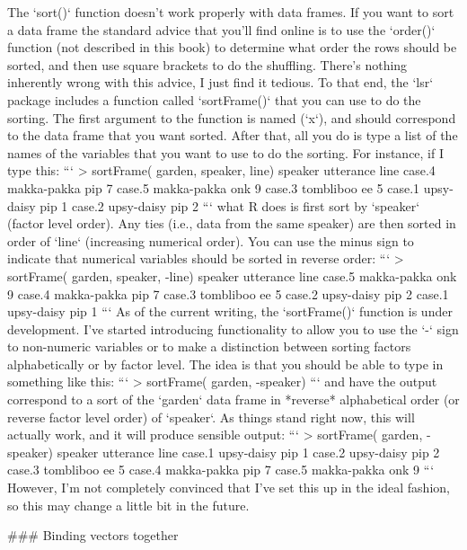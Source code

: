 The `sort()` function doesn't work properly with data frames. If you want to sort a data frame the standard advice that you'll find online is to use the `order()` function (not described in this book) to determine what order the rows should be sorted, and then use square brackets to do the shuffling. There's nothing inherently wrong with this advice, I just find it tedious. To that end, the `lsr` package includes a function called `sortFrame()` that you can use to do the sorting. The first argument to the function is named (`x`), and should correspond to the data frame that you want sorted. After that, all you do is type a list of the names of the variables that you want to use to do the sorting. For instance, if I type this:
```
> sortFrame( garden, speaker, line)
           speaker utterance line
case.4 makka-pakka       pip    7
case.5 makka-pakka       onk    9
case.3   tombliboo        ee    5
case.1  upsy-daisy       pip    1
case.2  upsy-daisy       pip    2
```
what R does is first sort by `speaker` (factor level order). Any ties (i.e., data from the same speaker) are then sorted in order of `line` (increasing numerical order). You can use the minus sign to indicate that numerical variables should be sorted in reverse order:
```
> sortFrame( garden, speaker, -line)
           speaker utterance line
case.5 makka-pakka       onk    9
case.4 makka-pakka       pip    7
case.3   tombliboo        ee    5
case.2  upsy-daisy       pip    2
case.1  upsy-daisy       pip    1
```
As of the current writing, the `sortFrame()` function is under development. I've started introducing functionality to allow you to use the `-` sign to non-numeric variables or to make a distinction between sorting factors alphabetically or by factor level. The idea is that you should be able to type in something like this: 
```
> sortFrame( garden, -speaker)
```
and have the output correspond to a sort of the `garden` data frame in *reverse* alphabetical order (or reverse factor level order) of `speaker`. As things stand right now, this will actually work, and it will produce sensible output:
```
> sortFrame( garden, -speaker)
           speaker utterance line
case.1  upsy-daisy       pip    1
case.2  upsy-daisy       pip    2
case.3   tombliboo        ee    5
case.4 makka-pakka       pip    7
case.5 makka-pakka       onk    9
```
However, I'm not completely convinced that I've set this up in the ideal fashion, so this may change a little bit in the future.

### Binding vectors together


